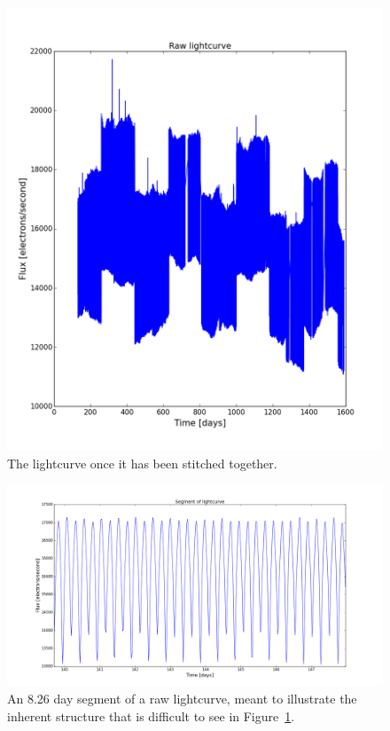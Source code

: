 \documentclass[12pt]{article}
\begin{document}
\begin{figure}
    \includegraphics[width=\textwidth]{Raw_lightcurve.png}
    \caption{The lightcurve once it has been stitched together.}
    \label{fig:Raw_lc}
    
\end{figure}

\begin{figure}
    \includegraphics[width=\textwidth]{Segment_of_lightcurve.png}
    \caption{An 8.26 day segment of a raw lightcurve, meant to illustrate the inherent structure that is difficult to see in Figure~\ref{fig:Raw_lc}.}
    \label{fig:Seg_lc}
    
\end{figure}
\end{document}
